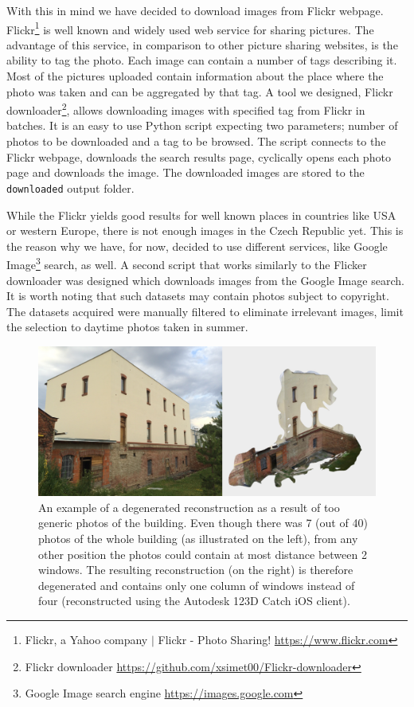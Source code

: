 With this in mind we have decided to download images from Flickr webpage. Flickr\footnote{Flickr, a Yahoo company $|$ Flickr - Photo Sharing! \url{https://www.flickr.com}} is well known and widely used web service for sharing pictures. The advantage of this service, in comparison to other picture sharing websites, is the ability to tag the photo. Each image can contain a number of tags describing it. Most of the pictures uploaded contain information about the place where the photo was taken and can be aggregated by that tag. A tool we designed, Flickr downloader\footnote{Flickr downloader \url{https://github.com/xsimet00/Flickr-downloader}}, allows downloading images with specified tag from Flickr in batches. It is an easy to use Python script expecting two parameters; number of photos to be downloaded and a tag to be browsed. The script connects to the Flickr webpage, downloads the search results page, cyclically opens each photo page and downloads the image. The downloaded images are stored to the \texttt{downloaded} output folder.

While the Flickr yields good results for well known places in countries like USA or western Europe, there is not enough images in the Czech Republic yet. This is the reason why we have, for now, decided to use different services, like Google Image\footnote{Google Image search engine \url{https://images.google.com}} search, as well. A second script that works similarly to the Flicker downloader was designed which downloads images from the Google Image search. It is worth noting that such datasets may contain photos subject to copyright. The datasets acquired were manually filtered to eliminate irrelevant images, limit the selection to daytime photos taken in summer.

\begin{figure}[ht]
	\begin{center}
		\includegraphics[keepaspectratio,width=\textwidth]{fig/degenerated-dataset.pdf}
	\end{center}
	\caption{An example of a degenerated reconstruction as a result of too generic photos of the building. Even though there was 7 (out of 40)  photos of the whole building (as illustrated on the left), from any other position the photos could contain at most distance between 2 windows. The resulting reconstruction (on the right) is therefore degenerated and contains only one column of windows instead of four (reconstructed using the Autodesk 123D Catch iOS client).}
	\label{fig:degenerated-dataset}
\end{figure}

